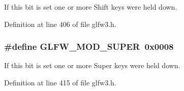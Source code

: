 If this bit is set one or more Shift keys were held down. 



Definition at line 406 of file glfw3.\-h.

\hypertarget{group__mods_ga6b64ba10ea0227cf6f42efd0a220aba1}{
\subsubsection[{G\-L\-F\-W\-\_\-\-M\-O\-D\-\_\-\-S\-U\-P\-E\-R}]{\setlength{\rightskip}{0pt plus 5cm}\#define G\-L\-F\-W\-\_\-\-M\-O\-D\-\_\-\-S\-U\-P\-E\-R~0x0008}}\label{group__mods_ga6b64ba10ea0227cf6f42efd0a220aba1}


If this bit is set one or more Super keys were held down. 



Definition at line 415 of file glfw3.\-h.

